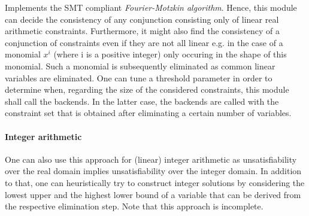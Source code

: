Implements the SMT compliant \emph{Fourier-Motzkin algorithm}.
Hence, this module can decide the consistency of any conjunction
consisting only of linear real arithmetic constraints. Furthermore,
it might also find the consistency of a conjunction of constraints
even if they are not all linear e.g. in the case of a monomial $x^i$ 
(where i is a positive integer) only occuring in the shape of this
monomial. Such a monomial is subsequently eliminated as common linear
variables are eliminated. One can tune a threshold parameter in order to
determine when, regarding the size of the considered constraints, 
this module shall call the backends. In the latter case, the backends are called
with the constraint set that is obtained after eliminating a certain
number of variables.  

\paragraph{Integer arithmetic} One can also use this approach for (linear) integer arithmetic
as unsatisfiability over the real domain implies unsatisfiability over the integer
domain. In addition to that, one can heuristically try to construct integer solutions
by considering the lowest upper and the highest lower bound of a variable that can be derived
from the respective elimination step. Note that this approach is incomplete.  
